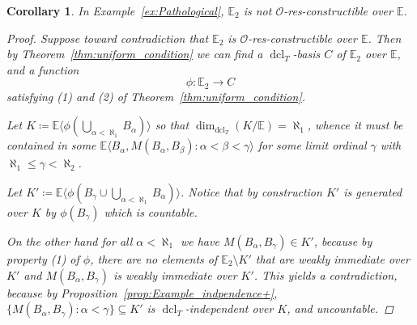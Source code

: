 \documentclass{amsart}
\newtheorem{corollary}[theorem]{Corollary}
\theoremstyle{remark}
\theoremstyle{definition}
\theoremstyle{plain}
\newcommand{\bE}{\mathbb E}
\newcommand{\cO}{\mathcal O}
\DeclareMathOperator{\dcl}{\mathrm{dcl}}
\theoremstyle{plain}
\begin{document}
\begin{corollary}
    In Example~\ref{ex:Pathological}, $\bE_2$ is not $\cO$-res-constructible over $\bE$.
    \begin{proof}
        Suppose toward contradiction that $\bE_2$ is $\cO$-res-constructible over $\bE$. Then by Theorem~\ref{thm:uniform_condition} we can find a $\dcl_T$-basis $C$ of $\bE_2$ over $\bE$, and a function
        \[\phi : \bE_2 \rightarrow C\]
        satisfying (1) and (2) of Theorem~\ref{thm:uniform_condition}.
        
        Let $K\coloneqq \bE \langle \phi(\bigcup_{\alpha <\aleph_1} B_\alpha)\rangle$ so that $\dim_{\dcl_T}(K/\bE)=\aleph_1$, whence it must be contained in some $\bE \langle B_\alpha, M(B_\alpha, B_\beta) : \alpha <\beta<\gamma\rangle$ for some limit ordinal $\gamma$ with $\aleph_1 \leq \gamma<\aleph_2$.
        
        Let $K'\coloneqq  \bE \langle \phi( B_\gamma \cup \bigcup_{\alpha< \aleph_1} B_\alpha) \rangle$.
        Notice that by construction $K'$ is generated over $K$ by $\phi(B_\gamma)$ which is countable.
        
        On the other hand for all $\alpha < \aleph_1$ we have $M(B_\alpha, B_\gamma) \in K'$, because by property (1) of $\phi$, there are no elements of $\bE_2 \setminus K'$ that are weakly immediate over $K'$ and $M(B_\alpha, B_\gamma)$ is weakly immediate over $K'$.
        This yields a contradiction, because by Proposition~\ref{prop:Example_indpendence+}, $\{M(B_\alpha, B_\gamma): \alpha <\gamma\} \subseteq K'$ is $\dcl_T$-independent over $K$, and uncountable.
    \end{proof}
\end{corollary}
    
\end{document}
